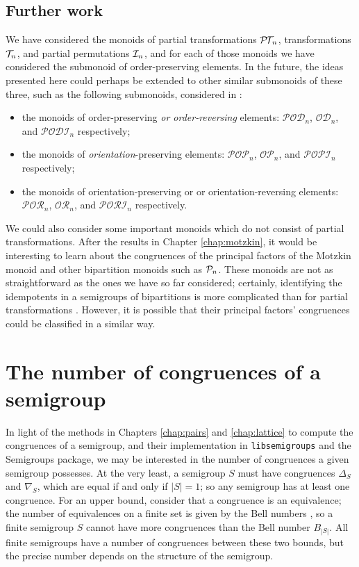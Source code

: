 \subsection{Further work}
\label{sec:princfact-further}
We have considered the monoids of partial transformations $\mathcal{P\!T\!}_n$,
transformations $\mathcal{T}_n$, and partial permutations $\mathcal{I}_n$, and for each of those
monoids we have considered the submonoid of order-preserving elements.  In the
future, the ideas presented here could perhaps be extended to other similar
submonoids of these three, such as the following submonoids, considered in
\cite[\S1.2]{wilf_ii}:

\begin{itemize}
\item the monoids of order-preserving \textit{or order-reversing} elements:
  $\mathcal{P\!O\!D\!}_n$, $\mathcal{O\!D\!}_n$, and $\mathcal{P\!O\!D\!I\!}_n$
  respectively;
\item the monoids of \textit{orientation}-preserving elements:
  $\mathcal{P\!O\!P\!}_n$, $\mathcal{O\!P\!}_n$, and $\mathcal{P\!O\!P\!I\!}_n$
  respectively;
\item the monoids of orientation-preserving or or orientation-reversing
  elements: $\mathcal{P\!O\!R\!}_n$, $\mathcal{O\!R\!}_n$, and
  $\mathcal{P\!O\!R\!I\!}_n$ respectively.
\end{itemize}

We could also consider some important monoids which do not consist of partial
transformations.  After the results in Chapter \ref{chap:motzkin}, it would be
interesting to learn about the congruences of the principal factors of the
Motzkin monoid and other bipartition monoids such as $\mathcal{P}_n$.  These monoids
are not as straightforward as the ones we have so far considered; certainly,
identifying the idempotents in a semigroups of bipartitions is more complicated
than for partial transformations \cite[Theorem 5]{pn_ids}.  However, it is
possible that their principal factors' congruences could be classified in a
similar way.



\section{The number of congruences of a semigroup}
\label{sec:nrcongs}

In light of the methods in Chapters \ref{chap:pairs} and \ref{chap:lattice} to
compute the congruences of a semigroup, and their implementation in
\texttt{libsemigroups} and the Semigroups package, we may be interested in the
number of congruences a given semigroup possesses.  At the very least, a
semigroup $S$ must have congruences $\Delta_S$ and $\nabla_S$, which are equal
if and only if $|S| = 1$; so any semigroup has at least one congruence.  For an
upper bound, consider that a congruence is an equivalence; the number of
equivalences on a finite set is given by the Bell numbers , so
a finite semigroup $S$ cannot have more congruences than the Bell number
$B_{|S|}$.  All finite semigroups have a number of congruences between these two
bounds, but the precise number depends on the structure of the semigroup.

